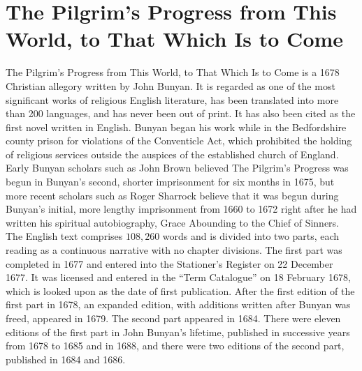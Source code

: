 \section{The Pilgrim’s Progress from This World, to That Which Is to Come}

\begin{displayquote}
The Pilgrim’s Progress from This World, to That Which Is to Come is a 1678 
Christian allegory written by John Bunyan. It is regarded as one of the most 
significant works of religious English literature, has been translated into more 
than 200 languages, and has never been out of print. It has also been cited as 
the first novel written in English. Bunyan began his work while in the 
Bedfordshire county prison for violations of the Conventicle Act, which 
prohibited the holding of religious services outside the auspices of the 
established church of England. Early Bunyan scholars such as John Brown believed 
The Pilgrim’s Progress was begun in Bunyan’s second, shorter imprisonment for 
six months in 1675, but more recent scholars such as Roger Sharrock believe that 
it was begun during Bunyan’s initial, more lengthy imprisonment from 1660 to 
1672 right after he had written his spiritual autobiography, Grace Abounding to 
the Chief of Sinners. The English text comprises $108,260$ words and is divided 
into two parts, each reading as a continuous narrative with no chapter 
divisions. The first part was completed in 1677 and entered into the Stationer’s 
Register on 22 December 1677. It was licensed and entered in the “Term 
Catalogue” on 18 February 1678, which is looked upon as the date of first 
publication. After the first edition of the first part in 1678, an expanded 
edition, with additions written after Bunyan was freed, appeared in 1679. The 
second part appeared in 1684. There were eleven editions of the first part in 
John Bunyan’s lifetime, published in successive years from 1678 to 1685 and in 
1688, and there were two editions of the second part, published in 1684 and 
1686. \autocite{bunyan2018}    
\end{displayquote}


